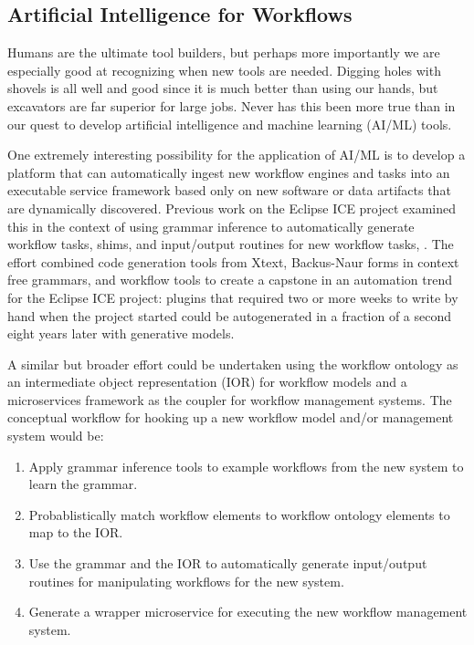 \subsection{Artificial Intelligence for Workflows}

Humans are the ultimate tool builders, but perhaps more importantly we are
especially good at recognizing when new tools are needed. Digging holes with
shovels is all well and good since it is much better than using our hands,
but excavators are far superior for large jobs. Never has this been more
true than in our quest to develop artificial intelligence and machine learning
(AI/ML) tools.

One extremely interesting possibility for the application of AI/ML is to develop
a platform that can automatically ingest new workflow engines and tasks
into an executable service framework based only on new software or data
artifacts that are dynamically discovered. Previous work on the Eclipse ICE
project examined this in the context of using grammar inference to
automatically generate workflow tasks, shims, and input/output routines for new
workflow tasks, \cite{bennett_rapid_2015}. The effort combined code
generation tools from Xtext, Backus-Naur forms in context free grammars, and
workflow tools to create a capstone in an automation trend for
the Eclipse ICE project: plugins that required two or more weeks to write by
hand when the project started could be autogenerated in a fraction of a second
eight years later with generative models.

A similar but broader effort could be undertaken using the workflow ontology as
an intermediate object representation (IOR) for workflow models and a
microservices framework as the coupler for workflow management systems. The
conceptual workflow for hooking up a new workflow model and/or management
system would be:
\begin{enumerate}
  \item Apply grammar inference tools to example workflows from the new system
  to learn the grammar.
  \item Probablistically match workflow elements to workflow ontology elements
  to map to the IOR.
  \item Use the grammar and the IOR to automatically generate input/output
  routines for manipulating workflows for the new system. 
  \item Generate a wrapper microservice for executing the new workflow
  management system.
\end{enumerate}

